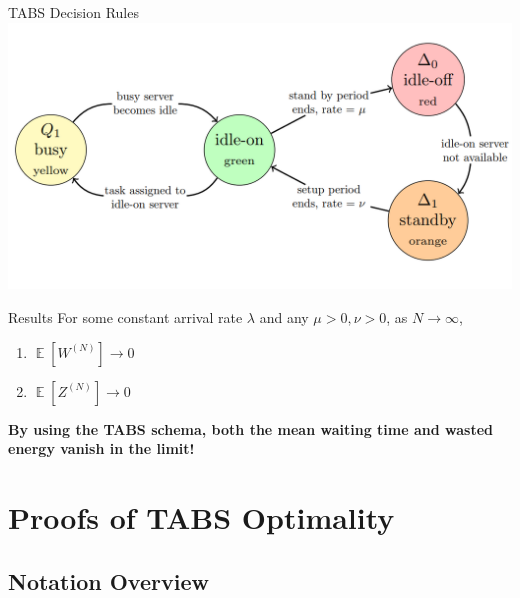 \documentclass{beamer}
\DeclareMathOperator*{\E}{\mathbb{E}}
\begin{document}
\begin{frame}{TABS Decision Rules}
	\centering
	\includegraphics[scale=.3]{tabs}
	\centering
\end{frame}

\begin{frame}{Results}
	For some constant arrival rate $\lambda$ and any $\mu > 0, \nu > 0$, as $N \rightarrow \infty$,
	\begin{enumerate}[label=(\alph*)]
		\item $\E[W^{(N)}] \rightarrow 0$
		\item $\E[Z^{(N)}] \rightarrow 0$
	\end{enumerate}

	\centering
	\textbf{By using the TABS schema, both the mean waiting time and wasted energy vanish in the limit!}
	\centering

\end{frame}

\section{Proofs of TABS Optimality}

\subsection{Notation Overview}
\end{document}
